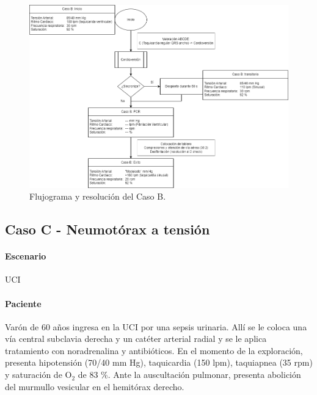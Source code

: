 \begin{figure}[hptb]
    \centering
	\includegraphics[width=0.766\linewidth]{./imagenes/ACV-AdSC-CasosUCI_CasoB.png}
	\caption{\label{fig:Brusilov:SVI:CasoB}Flujograma y resolución del Caso B.}
\end{figure}
\clearpage

\subsection{Caso C - Neumotórax a tensión}
\paragraph{Escenario} UCI
\vspace{-12.5pt}
\paragraph{Paciente} Varón de 60 años ingresa en la UCI por una sepsis urinaria. Allí se le coloca una vía central subclavia derecha y un catéter arterial radial y se le aplica tratamiento con noradrenalina y antibióticos. En el momento de la exploración, presenta hipotensión (70/40 mm Hg), taquicardia (150 lpm), taquiapnea (35 rpm) y saturación de O$_2$ de 83 \%. Ante la auscultación pulmonar, presenta abolición del murmullo vesicular en el hemitórax derecho.
\vspace{-12.5pt}
